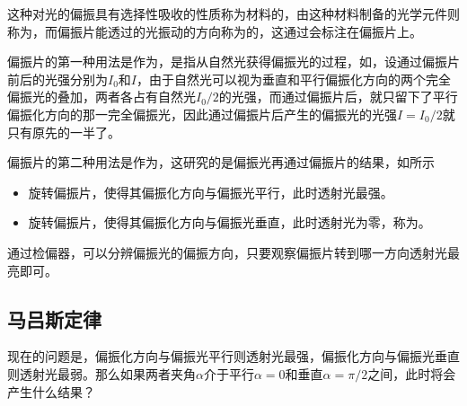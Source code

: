 这种对光的偏振具有选择性吸收的性质称为材料的，由这种材料制备的光学元件则称为，而偏振片能透过的光振动的方向称为的，这通过会标注在偏振片上。

偏振片的第一种用法是作为，是指从自然光获得偏振光的过程，如，设通过偏振片前后的光强分别为$I_0$和$I$，由于自然光可以视为垂直和平行偏振化方向的两个完全偏振光的叠加，两者各占有自然光$I_0/2$的光强，而通过偏振片后，就只留下了平行偏振化方向的那一完全偏振光，因此通过偏振片后产生的偏振光的光强$I=I_0/2$就只有原先的一半了。
\begin{OldFigure}[起偏器]
\end{OldFigure}

偏振片的第二种用法是作为，这研究的是偏振光再通过偏振片的结果，如所示
\begin{itemize}
    \item 旋转偏振片，使得其偏振化方向与偏振光平行，此时透射光最强。
    \item 旋转偏振片，使得其偏振化方向与偏振光垂直，此时透射光为零，称为。
\end{itemize}
\begin{OldFigure}[检偏器]
    \begin{OldFigureSub}[最亮]
    \end{OldFigureSub}\vspace{0.5cm}
    \begin{OldFigureSub}[最暗]
    \end{OldFigureSub}
\end{OldFigure}
通过检偏器，可以分辨偏振光的偏振方向，只要观察偏振片转到哪一方向透射光最亮即可。

\subsection{马吕斯定律}
\label{subsec:马吕斯定律}
现在的问题是，偏振化方向与偏振光平行则透射光最强，偏振化方向与偏振光垂直则透射光最弱。那么如果两者夹角$\alpha$介于平行$\alpha=0$和垂直$\alpha=\pi/2$之间，此时将会产生什么结果？


